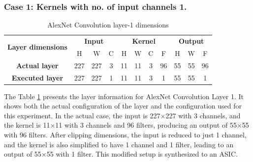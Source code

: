 \subsubsection{Case 1: Kernels with no. of input channels 1.}


\begin{table}[H]
\centering
\caption{AlexNet Convolution layer-1 dimensions}
\label{tab:permConvolutionCase1Dim}
 \begin{tabular}{|c|c|c|c|c|c|c|c|c|c|c|} \hline  
 
 \multirow{2}{*}{\textbf{Layer dimensions}} &  
 \multicolumn{3}{|c|}{\textbf{Input}} &  
 \multicolumn{4}{|c|}{\textbf{Kernel}} &  
 \multicolumn{3}{|c|}{\textbf{Output}}\\ \cline{2-11}
 & H &  W &  C&  H &  W &  C &  F &  H &  W & F\\ \hline  
 \textbf{Actual layer} &  227 &  227 &  3 & 11 & 11 & 3 & 96 & 55 & 55 & 96\\ \hline 
 \textbf{Executed layer} &  227 &  227 &  \cellcolor{yellow}1 & 11 & 11 & 3 & \cellcolor{yellow}1 & 55 & 55 & \cellcolor{yellow}1 \\ \hline 
 \end{tabular}
\end{table}

The Table \ref{tab:permConvolutionCase1Dim} presents the layer information for AlexNet Convolution Layer 1. It shows both the actual configuration of the layer and the configuration used for this experiment. In the actual case, the input is 227×227 with 3 channels, and the kernel is 11×11 with 3 channels and 96 filters, producing an output of 55×55 with 96 filters. After clipping dimensions, the input is reduced to just 1 channel, and the kernel is also simplified to have 1 channel and 1 filter, leading to an output of 55×55 with 1 filter. This modified setup is synthesized to an ASIC.


\begin{table}[H]
\centering
\caption{Output-first permutation}
\label{tab:permConvolutionCase1Op}
\end{table}


